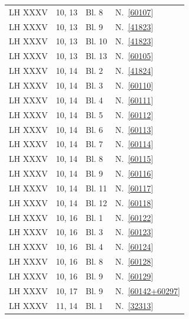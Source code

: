 \begin{longtable}{llll}
LH XXXV & 10, 13 & Bl. 8 & N.~\ref{60107}\\

LH XXXV & 10, 13 & Bl. 9 & N.~\ref{41823}\\

LH XXXV & 10, 13 & Bl. 10\textendash 11 & N.~\ref{41823}\\

LH XXXV & 10, 13 & Bl. 13 & N.~\ref{60105}\\

LH XXXV & 10, 14 & Bl. 2 & N.~\ref{41824}\\

LH XXXV & 10, 14 & Bl. 3 & N.~\ref{60110}\\

LH XXXV & 10, 14 & Bl. 4 & N.~\ref{60111}\\

LH XXXV & 10, 14 & Bl. 5 & N.~\ref{60112}\\

LH XXXV & 10, 14 & Bl. 6 & N.~\ref{60113}\\

LH XXXV & 10, 14 & Bl. 7 & N.~\ref{60114}\\

LH XXXV & 10, 14 & Bl. 8 & N.~\ref{60115}\\

LH XXXV & 10, 14 & Bl. 9\textendash 10 & N.~\ref{60116}\\

LH XXXV & 10, 14 & Bl. 11 & N.~\ref{60117}\\

LH XXXV & 10, 14 & Bl. 12 & N.~\ref{60118}\\

LH XXXV & 10, 16 & Bl. 1\textendash 2 & N.~\ref{60122}\\

LH XXXV & 10, 16 & Bl. 3\textendash 4 & N.~\ref{60123}\\

LH XXXV & 10, 16 & Bl. 4 & N.~\ref{60124}\\

LH XXXV & 10, 16 & Bl. 8 & N.~\ref{60128}\\

LH XXXV & 10, 16 & Bl. 9 & N.~\ref{60129}\\

LH XXXV & 10, 17 & Bl. 9 & N.~\ref{60142+60297}\\

LH XXXV & 11, 14 & Bl. 1\textendash 2 & N.~\ref{32313}\\


\end{longtable}
